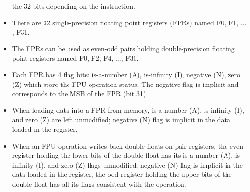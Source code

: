 \begin{itemize}
         the 32 bits depending on the instruction.
   \item There are 32 single-precision floating point registers (FPRs) named F0, F1, $\ldots$, F31.
   \item The FPRs can be used as even-odd pairs holding double-precision floating point registers named F0, F2, F4, $\ldots$, F30.
   \item Each FPR has 4 flag bits: is-a-number (A), is-infinity (I), negative (N), zero (Z) which store the FPU operation status. The negative
         flag is implicit and corresponds to the MSB of the FPR (bit 31).
   \item When loading data into a FPR from memory, is-a-number (A), is-infinity (I), and zero (Z) are left unmodified; negative (N) flag is implicit in
         the data loaded in the register.
   \item When an FPU operation writes back double floats on pair registers, the even register holding the lower bits of the double float has its is-a-number
         (A), is-infinity (I), and zero (Z) flags unmodified; negative (N) flag is implicit in the data loaded in the register, the odd register holding the
         upper bits of the double float has all its flags consistent with the operation.
\end{itemize}

